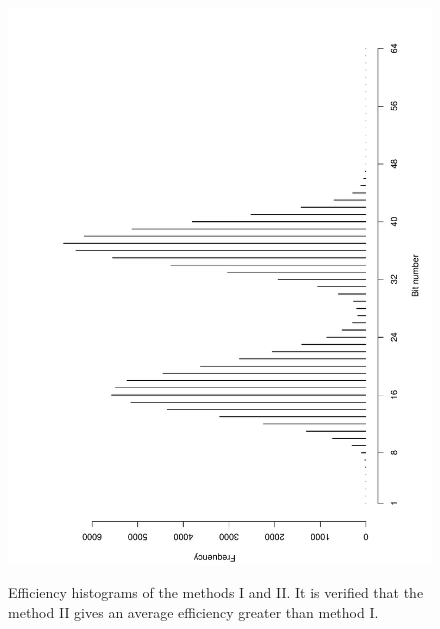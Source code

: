 \documentclass[10pt]{article}
\begin{document}
\begin{figure}[h]
{  \includegraphics[scale=0.4,angle=-90]{fig15}
  \label{fig15}
  }
  \caption{Efficiency histograms of the methods I and II. It is verified that the method II gives an average efficiency greater than method I.}
  \label{fig:1415}
\end{figure}
\end{document}
